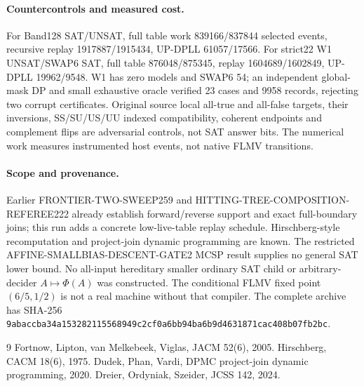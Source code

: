 \documentclass[11pt]{article}
\begin{document}
\paragraph{Countercontrols and measured cost.}
For Band128 SAT/UNSAT, full table work 839166/837844 selected events,
recursive replay 1917887/1915434, UP-DPLL 61057/17566. For strict22
W1 UNSAT/SWAP6 SAT, full table 876048/875345, replay 1604689/1602849,
UP-DPLL 19962/9548. W1 has zero models and SWAP6 54; an independent
global-mask DP and small exhaustive oracle verified 23 cases and 9958
records, rejecting two corrupt certificates. Original source local all-true
and all-false targets, their inversions, SS/SU/US/UU indexed compatibility,
coherent endpoints and complement flips are adversarial controls, not
SAT answer bits. The numerical work measures instrumented host events,
not native FLMV transitions.

\paragraph{Scope and provenance.}
Earlier FRONTIER-TWO-SWEEP259 and HITTING-TREE-COMPOSITION-REFEREE222
already establish forward/reverse support and exact full-boundary joins;
this run adds a concrete low-live-table replay schedule. Hirschberg-style
recomputation and project-join dynamic programming are known.
The restricted AFFINE-SMALLBIAS-DESCENT-GATE2 MCSP result supplies no
general SAT lower bound. No all-input hereditary smaller ordinary SAT child
or arbitrary-decider $A\mapsto\Phi(A)$ was constructed. The conditional
FLMV fixed point $(6/5,1/2)$ is not a real machine without that compiler.
The complete archive has SHA-256
\texttt{9abaccba34a153282115568949c2cf0a6bb94ba6b9d4631871cac408b07fb2bc}.
\begin{thebibliography}{9}
 Fortnow, Lipton, van Melkebeek, Viglas, JACM 52(6), 2005.
 Hirschberg, CACM 18(6), 1975.
 Dudek, Phan, Vardi, DPMC project-join dynamic programming, 2020.
 Dreier, Ordyniak, Szeider, JCSS 142, 2024.
\end{thebibliography}
\end{document}
